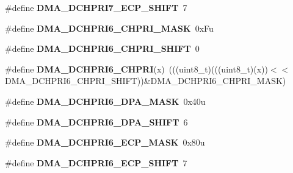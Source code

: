 \begin{DoxyCompactItemize}
\item 
\#define {\bfseries D\+M\+A\+\_\+\+D\+C\+H\+P\+R\+I7\+\_\+\+E\+C\+P\+\_\+\+S\+H\+I\+FT}~7\hypertarget{group__DMA__Register__Masks_gad2c636360eb68d654d17b99db5d849d6}{}\label{group__DMA__Register__Masks_gad2c636360eb68d654d17b99db5d849d6}

\item 
\#define {\bfseries D\+M\+A\+\_\+\+D\+C\+H\+P\+R\+I6\+\_\+\+C\+H\+P\+R\+I\+\_\+\+M\+A\+SK}~0x\+Fu\hypertarget{group__DMA__Register__Masks_ga30dc9b09d09c54838004e9c23a16c6b7}{}\label{group__DMA__Register__Masks_ga30dc9b09d09c54838004e9c23a16c6b7}

\item 
\#define {\bfseries D\+M\+A\+\_\+\+D\+C\+H\+P\+R\+I6\+\_\+\+C\+H\+P\+R\+I\+\_\+\+S\+H\+I\+FT}~0\hypertarget{group__DMA__Register__Masks_gac12a93574812e9019f2e7dc31e844205}{}\label{group__DMA__Register__Masks_gac12a93574812e9019f2e7dc31e844205}

\item 
\#define {\bfseries D\+M\+A\+\_\+\+D\+C\+H\+P\+R\+I6\+\_\+\+C\+H\+P\+RI}(x)~(((uint8\+\_\+t)(((uint8\+\_\+t)(x))$<$$<$D\+M\+A\+\_\+\+D\+C\+H\+P\+R\+I6\+\_\+\+C\+H\+P\+R\+I\+\_\+\+S\+H\+I\+FT))\&D\+M\+A\+\_\+\+D\+C\+H\+P\+R\+I6\+\_\+\+C\+H\+P\+R\+I\+\_\+\+M\+A\+SK)\hypertarget{group__DMA__Register__Masks_gabc1596123bcd7d1c8072729515b44d0f}{}\label{group__DMA__Register__Masks_gabc1596123bcd7d1c8072729515b44d0f}

\item 
\#define {\bfseries D\+M\+A\+\_\+\+D\+C\+H\+P\+R\+I6\+\_\+\+D\+P\+A\+\_\+\+M\+A\+SK}~0x40u\hypertarget{group__DMA__Register__Masks_gaf4b1d9494691bb0d118593c119789378}{}\label{group__DMA__Register__Masks_gaf4b1d9494691bb0d118593c119789378}

\item 
\#define {\bfseries D\+M\+A\+\_\+\+D\+C\+H\+P\+R\+I6\+\_\+\+D\+P\+A\+\_\+\+S\+H\+I\+FT}~6\hypertarget{group__DMA__Register__Masks_gaeb900ebd7efd790f06ce39a68735defa}{}\label{group__DMA__Register__Masks_gaeb900ebd7efd790f06ce39a68735defa}

\item 
\#define {\bfseries D\+M\+A\+\_\+\+D\+C\+H\+P\+R\+I6\+\_\+\+E\+C\+P\+\_\+\+M\+A\+SK}~0x80u\hypertarget{group__DMA__Register__Masks_gaa5c231f95cecf67801dc43ea987a5caf}{}\label{group__DMA__Register__Masks_gaa5c231f95cecf67801dc43ea987a5caf}

\item 
\#define {\bfseries D\+M\+A\+\_\+\+D\+C\+H\+P\+R\+I6\+\_\+\+E\+C\+P\+\_\+\+S\+H\+I\+FT}~7\hypertarget{group__DMA__Register__Masks_ga467da6c912746a19226a13ba1d2ff1c1}{}\label{group__DMA__Register__Masks_ga467da6c912746a19226a13ba1d2ff1c1}


\end{DoxyCompactItemize}
